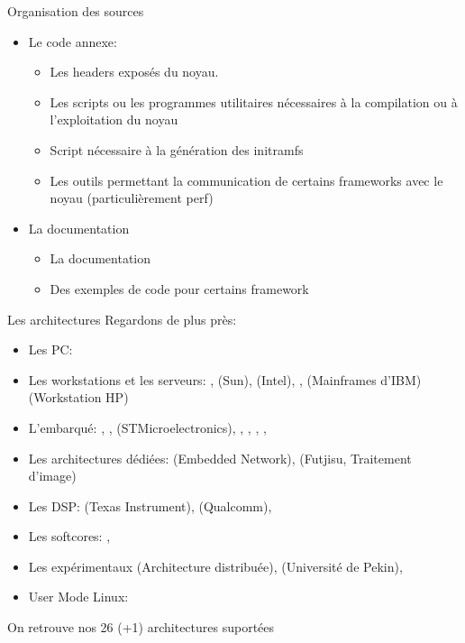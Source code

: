 \begin{frame}[fragile=singleslide]{Organisation des sources}
  \begin{itemize} 
  \item Le code annexe:
    \begin{itemize} 
    \item {} Les headers exposés du noyau.
    \item  {} Les  scripts ou  les  programmes utilitaires
      nécessaires à la compilation ou à l'exploitation du noyau
    \item {} Script nécessaire à la génération des initramfs
    \item  {}  Les  outils  permettant la  communication  de
      certains frameworks avec le noyau (particulièrement perf)
    \end{itemize} 
  \item La documentation
    \begin{itemize} 
    \item {} La documentation
    \item {} Des exemples de code pour certains framework
    \end{itemize} 
  \end{itemize} 
\end{frame} 

\begin{frame}[fragile=singleslide]{Les architectures}
  Regardons  de plus près:
  \begin{itemize} 
  \item Les PC: 
  \item Les  workstations et les  serveurs: , 
    (Sun),        (Intel),   ,    
    (Mainframes d'IBM)  (Workstation HP)
  \item     L'embarqué:     ,     ,     
    (STMicroelectronics),   ,  ,  ,
    ,  
  \item  Les architectures  dédiées:   (Embedded  Network),
     (Futjisu, Traitement d'image)
  \item  Les   DSP:    (Texas   Instrument),  
    (Qualcomm), 
  \item Les softcores: , 
  \item  Les   expérimentaux    (Architecture  distribuée),
     (Université de Pekin), 
  \item User Mode Linux: 
  \end{itemize} 
  On retrouve nos 26 (+1) architectures suportées
\end{frame}    


